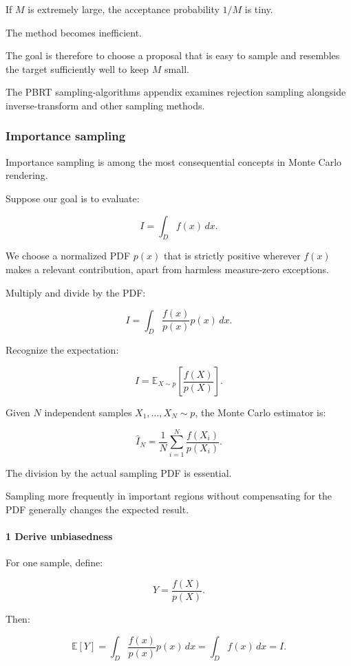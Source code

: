If \(M\) is extremely large, the acceptance probability \(1/M\) is tiny.

The method becomes inefficient.

The goal is therefore to choose a proposal that is easy to sample and resembles the target sufficiently well to keep \(M\) small.

The PBRT sampling-algorithms appendix examines rejection sampling alongside inverse-transform and other sampling methods.

\subsubsection{Importance sampling}\label{importance-sampling}

Importance sampling is among the most consequential concepts in Monte Carlo rendering.

Suppose our goal is to evaluate:

\[
 \boxed{ I=\int_Df(x)\,dx }.
\]

We choose a normalized PDF \(p(x)\) that is strictly positive wherever \(f(x)\) makes a relevant contribution, apart from harmless measure-zero exceptions.

Multiply and divide by the PDF:

\[
 I= \int_D \frac{f(x)}{p(x)}p(x)\,dx.
\]

Recognize the expectation:

\[
 \boxed{ I= \mathbb E_{X\sim p} \left[ \frac{f(X)}{p(X)} \right] }.
\]

Given \(N\) independent samples \(X_1,\ldots,X_N\sim p\), the Monte Carlo estimator is:

\[
 \boxed{ \widehat I_N= \frac1N\sum_{i=1}^{N} \frac{f(X_i)}{p(X_i)} }.
\]

The division by the actual sampling PDF is essential.

Sampling more frequently in important regions without compensating for the PDF generally changes the expected result.

\paragraph{1 Derive unbiasedness}\label{derive-unbiasedness}

For one sample, define:

\[
 Y=\frac{f(X)}{p(X)}.
\]

Then:

\[
 \mathbb E[Y] = \int_D \frac{f(x)}{p(x)}p(x)\,dx = \int_Df(x)\,dx =I.
\]

